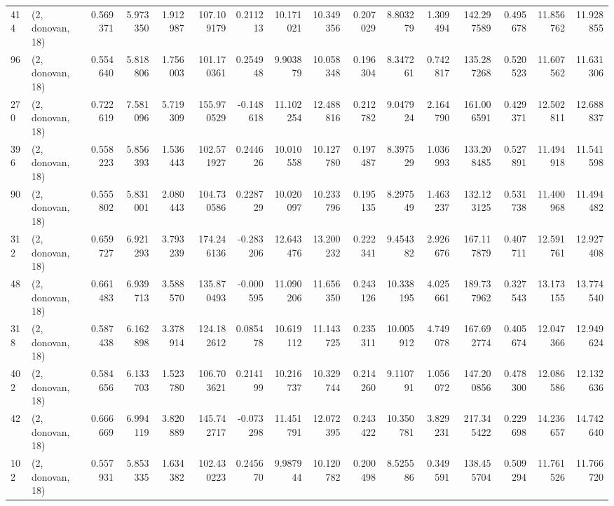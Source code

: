 \begin{tabular}{llrrrrrrrrrrrrrr}
414 &  (2, donovan, 18) &   0.569371 &   5.973350 &   1.912987 &   107.109179 &   0.211213 &  10.171021 &  10.349356 &  0.207029 &   8.803279 &   1.309494 &   142.297589 &   0.495678 &  11.856762 &  11.928855 \\
96  &  (2, donovan, 18) &   0.554640 &   5.818806 &   1.756003 &   101.170361 &   0.254948 &   9.903879 &  10.058348 &  0.196304 &   8.347261 &   0.742817 &   135.287268 &   0.520523 &  11.607562 &  11.631306 \\
270 &  (2, donovan, 18) &   0.722619 &   7.581096 &   5.719309 &   155.970529 &  -0.148618 &  11.102254 &  12.488816 &  0.212782 &   9.047924 &   2.164790 &   161.006591 &   0.429371 &  12.502811 &  12.688837 \\
396 &  (2, donovan, 18) &   0.558223 &   5.856393 &   1.536443 &   102.571927 &   0.244626 &  10.010558 &  10.127780 &  0.197487 &   8.397529 &   1.036993 &   133.208485 &   0.527891 &  11.494918 &  11.541598 \\
90  &  (2, donovan, 18) &   0.555802 &   5.831001 &   2.080443 &   104.730586 &   0.228729 &  10.020097 &  10.233796 &  0.195135 &   8.297549 &   1.463237 &   132.123125 &   0.531738 &  11.400968 &  11.494482 \\
312 &  (2, donovan, 18) &   0.659727 &   6.921293 &   3.793239 &   174.246136 &  -0.283206 &  12.643476 &  13.200232 &  0.222341 &   9.454382 &   2.926676 &   167.117879 &   0.407711 &  12.591761 &  12.927408 \\
48  &  (2, donovan, 18) &   0.661483 &   6.939713 &   3.588570 &   135.870493 &  -0.000595 &  11.090206 &  11.656350 &  0.243126 &  10.338195 &   4.025661 &   189.737962 &   0.327543 &  13.173155 &  13.774540 \\
318 &  (2, donovan, 18) &   0.587438 &   6.162898 &   3.378914 &   124.182612 &   0.085478 &  10.619112 &  11.143725 &  0.235311 &  10.005912 &   4.749078 &   167.692774 &   0.405674 &  12.047366 &  12.949624 \\
402 &  (2, donovan, 18) &   0.584656 &   6.133703 &   1.523780 &   106.703621 &   0.214199 &  10.216737 &  10.329744 &  0.214260 &   9.110791 &   1.056072 &   147.200856 &   0.478300 &  12.086586 &  12.132636 \\
42  &  (2, donovan, 18) &   0.666669 &   6.994119 &   3.820889 &   145.742717 &  -0.073298 &  11.451791 &  12.072395 &  0.243422 &  10.350781 &   3.829231 &   217.345422 &   0.229698 &  14.236657 &  14.742640 \\
102 &  (2, donovan, 18) &   0.557931 &   5.853335 &   1.634382 &   102.430223 &   0.245670 &   9.987944 &  10.120782 &  0.200498 &   8.525586 &   0.349591 &   138.455704 &   0.509294 &  11.761526 &  11.766720 \\

\end{tabular}
